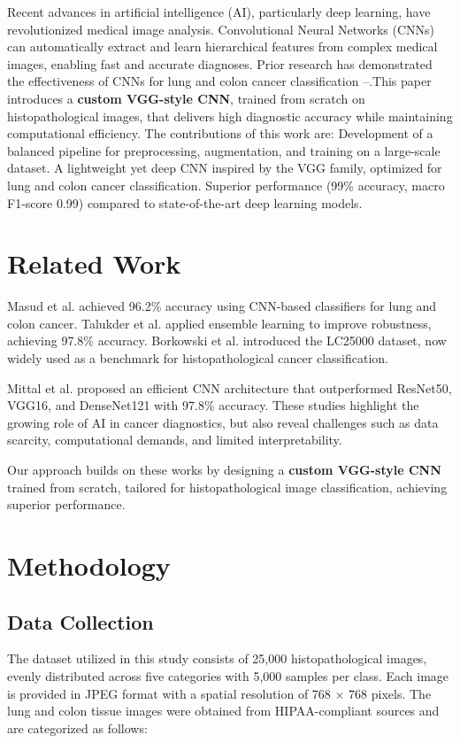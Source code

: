 \documentclass{ieeeaccess}
\begin{document}
Recent advances in artificial intelligence (AI), particularly deep learning, have revolutionized medical image analysis. Convolutional Neural Networks (CNNs) can automatically extract and learn hierarchical features from complex medical images, enabling fast and accurate diagnoses. Prior research has demonstrated the effectiveness of CNNs for lung and colon cancer classification \cite{b2}--\cite{b5}.This paper introduces a \textbf{custom VGG-style CNN}, trained from scratch on histopathological images, that delivers high diagnostic accuracy while maintaining computational efficiency. The contributions of this work are:
       Development of a balanced pipeline for preprocessing, augmentation, and
training on a large-scale dataset.
A lightweight yet deep CNN inspired by the VGG family, optimized for lung and colon cancer classification.
Superior performance (99\% accuracy, macro F1-score 0.99) compared to state-of-the-art deep learning models. 



\section{Related Work}
Masud et al. \cite{b2} achieved 96.2\% accuracy using CNN-based classifiers for lung and colon cancer. Talukder et al. \cite{b3} applied ensemble learning to improve robustness, achieving 97.8\% accuracy. Borkowski et al. \cite{b4} introduced the LC25000 dataset, now widely used as a benchmark for histopathological cancer classification.

Mittal et al. \cite{b5} proposed an efficient CNN architecture that outperformed ResNet50, VGG16, and DenseNet121 with 97.8\% accuracy. These studies highlight the growing role of AI in cancer diagnostics, but also reveal challenges such as data scarcity, computational demands, and limited interpretability.

Our approach builds on these works by designing a \textbf{custom VGG-style CNN} trained from scratch, tailored for histopathological image classification, achieving superior performance.
\section{Methodology}

\subsection{Data Collection}
The dataset utilized in this study consists of 25,000 histopathological images, evenly distributed across five categories with 5,000 samples per class. Each image is provided in JPEG format with a spatial resolution of 768 $\times$ 768 pixels. The lung and colon tissue images were obtained from HIPAA-compliant sources and are categorized as follows:  
\end{document}
